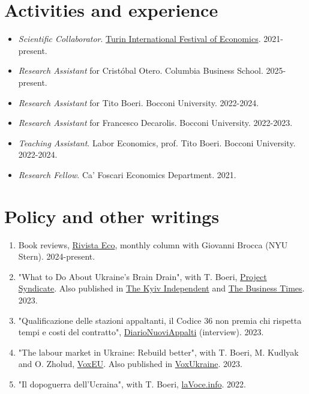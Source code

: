 \documentclass[letterpaper, 12pt]{article}
\begin{document}
\smallskip

\section*{Activities and experience}
\begin{itemize}
    \item[] \textit{Scientific Collaborator}. \href{https://www.festivalinternazionaledelleconomia.com/en/}{Turin International Festival of Economics}. 2021-present.
    \item[]  \textit{Research Assistant} for Cristóbal Otero. Columbia Business School. 2025-present. 
\item[]  \textit{Research Assistant} for Tito Boeri. Bocconi University. 2022-2024. 
\item[]  \textit{Research Assistant} for Francesco Decarolis. Bocconi University. 2022-2023. 
\item[]  \textit{Teaching Assistant}. Labor Economics, prof. Tito Boeri. Bocconi University. 2022-2024. 
\item[]  \textit{Research Fellow}. Ca' Foscari Economics Department. 2021.
\end{itemize}
\smallskip
\section*{Policy and other writings}
\begin{enumerate}
\item  Book reviews, \href{https://www.rivistaeco.com}{Rivista Eco}, monthly column with Giovanni Brocca (NYU Stern). 2024-present.
    \item  "What to Do About Ukraine's Brain Drain", with T. Boeri, \href{https://www.project-syndicate.org/commentary/ukraine-brain-drain-rebuilding-human-capital-by-giacomo-anastasia-and-tito-boeri-2023-11}{Project Syndicate}. Also published in \href{https://kyivindependent.com/opinion-what-to-do-about-ukraines-brain-drain/}{The Kyiv Independent} and \href{https://www.businesstimes.com.sg/opinion-features/what-do-about-ukraines-brain-drain}{The Business Times}. 2023.
    \item  "Qualificazione delle stazioni appaltanti, il Codice 36 non premia chi rispetta tempi e costi del contratto", \href{https://diarionuoviappalti.it/il-codice-36-non-premia-le-stazioni-appaltanti-che-rispettano-tempi-e-costi-del-contratto/}{DiarioNuoviAppalti} (interview). 2023.
    \item  "The labour market in Ukraine: Rebuild better", with T. Boeri, M. Kudlyak and O. Zholud, \href{https://cepr.org/voxeu/columns/labour-market-ukraine-rebuild-better}{VoxEU}. Also published in \href{https://voxukraine.org/en/the-labour-market-in-ukraine-rebuild-better/}{VoxUkraine}. 2023.
    \item  "Il dopoguerra dell'Ucraina", with T. Boeri, \href{https://www.lavoce.info/archives/99340/il-dopoguerra-dellucraina/}{laVoce.info}. 2022.

\end{enumerate}
\smallskip
\end{document}
